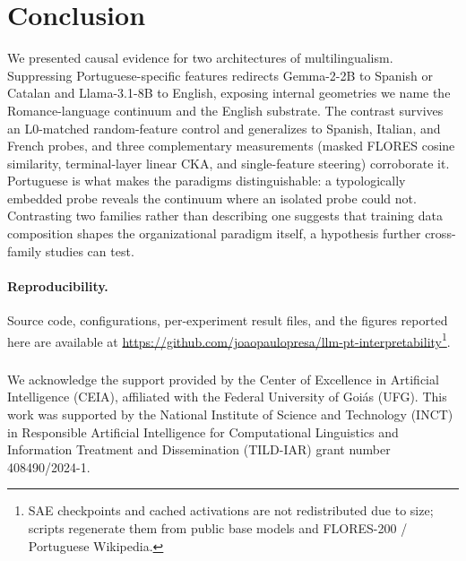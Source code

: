 \documentclass[runningheads]{llncs}
\begin{document}
\section{Conclusion}

We presented causal evidence for two architectures of multilingualism. Suppressing Portuguese-specific features redirects Gemma-2-2B to Spanish or Catalan and Llama-3.1-8B to English, exposing internal geometries we name the Romance-language continuum and the English substrate. The contrast survives an L0-matched random-feature control and generalizes to Spanish, Italian, and French probes, and three complementary measurements (masked FLORES cosine similarity, terminal-layer linear CKA, and single-feature steering) corroborate it. Portuguese is what makes the paradigms distinguishable: a typologically embedded probe reveals the continuum where an isolated probe could not. Contrasting two families rather than describing one suggests that training data composition shapes the organizational paradigm itself, a hypothesis further cross-family studies can test.

\paragraph{Reproducibility.} Source code, configurations, per-experiment result files, and the figures reported here are available at \url{https://github.com/joaopaulopresa/llm-pt-interpretability}\footnote{SAE checkpoints and cached activations are not redistributed due to size; scripts regenerate them from public base models and FLORES-200 / Portuguese Wikipedia.}.

\begin{credits}
\subsubsection{\ackname} We acknowledge the support provided by the Center of Excellence in Artificial Intelligence (CEIA), affiliated with the Federal University of Goiás (UFG). This work was supported by the National Institute of Science and Technology (INCT) in Responsible Artificial Intelligence for Computational Linguistics and Information Treatment and Dissemination (TILD-IAR) grant number 408490/2024-1.
\end{credits}



\end{document}
